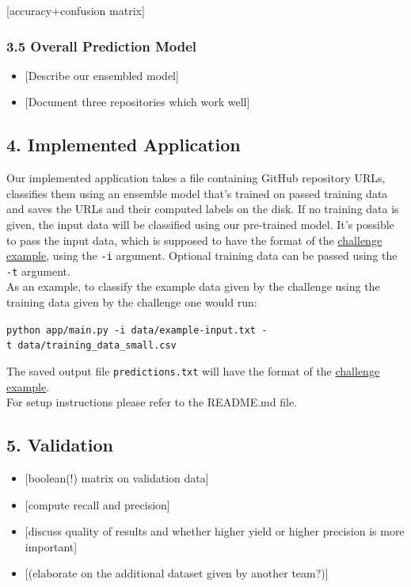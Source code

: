 \documentclass{article}
\providecommand{\tightlist}{%
  \setlength{\itemsep}{0pt}\setlength{\parskip}{0pt}}
\begin{document}
{[}accuracy+confusion matrix{]}

\subsubsection{3.5 Overall Prediction
Model}\label{overall-prediction-model}

\begin{itemize}
\tightlist
\item
  {[}Describe our ensembled model{]}
\item
  {[}Document three repositories which work well{]}
\end{itemize}

\subsection{4. Implemented Application}\label{implemented-application}

Our implemented application takes a file containing GitHub repository
URLs, classifies them using an ensemble model that's trained on passed
training data and saves the URLs and their computed labels on the disk.
If no training data is given, the input data will be classified using
our pre-trained model. It's possible to pass the input data, which is
supposed to have the format of the
\href{https://github.com/InformatiCup/InformatiCup2017/blob/master/example-input}{challenge
example}, using the \texttt{-i} argument. Optional training data can be
passed using the \texttt{-t} argument.\\
As an example, to classify the example data given by the challenge using
the training data given by the challenge one would run: ~

\texttt{python\ app/main.py\ -i\ data/example-input.txt\ -t\ data/training\_data\_small.csv}

The saved output file \texttt{predictions.txt} will have the format of
the
\href{https://github.com/InformatiCup/InformatiCup2017/blob/master/example-output}{challenge
example}.\\
For setup instructions please refer to the README.md file.

\subsection{5. Validation}\label{validation}

\begin{itemize}
\tightlist
\item
  {[}boolean(!) matrix on validation data{]}
\item
  {[}compute recall and precision{]}
\item
  {[}discuss quality of results and whether higher yield or higher
  precision is more important{]}
\item
  {[}(elaborate on the additional dataset given by another team?){]}
\end{itemize}
\end{document}
